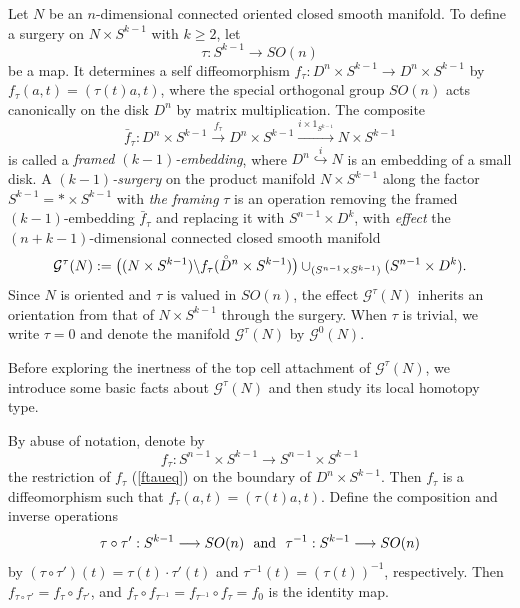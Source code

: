\documentclass[a4]{amsart}
\theoremstyle{definition}
\begin{document}
\begin{sloppypar}
Let $N$ be an $n$-dimensional connected oriented closed smooth manifold. To define a surgery on $N\times S^{k-1}$ with $k\geq 2$, let 
\[
\tau: S^{k-1}\stackrel{}{\longrightarrow} SO(n)
\]
be a map. 
It determines a self diffeomorphism $
f_\tau: D^n \times S^{k-1}\stackrel{}{\longrightarrow}D^n \times S^{k-1}
$ 
by $f_\tau (a, t)=(\tau(t)a, t)$, where the special orthogonal group $SO(n)$ acts canonically on the disk $D^n$ by matrix multiplication. The composite 
\begin{equation}\label{ftaueq}
\bar{f}_\tau: D^n \times S^{k-1}\stackrel{f_\tau}{\longrightarrow}D^n \times S^{k-1}\stackrel{i\times 1_{S^{k-1}}}{\longrightarrow}N\times S^{k-1}
\end{equation}
is called a {\it framed $(k-1)$-embedding}, where $D^n\stackrel{i}{\hookrightarrow} N$ is an embedding of a small disk. A {\it $(k-1)$-surgery} on the product manifold $N\times S^{k-1}$ along the factor $S^{k-1}=\ast\times S^{k-1}$ with {\it the framing} $\tau$ is an operation removing the framed $(k-1)$-embedding $\bar{f}_\tau$ and replacing it with $S^{n-1}\times D^k$, with {\it effect} the $(n+k-1)$-dimensional connected closed smooth manifold
\[
\mathcal{G}^{\tau}(N):=\big((N\times S^{k-1})\backslash f_\tau(\accentset{\circ}{D}^{n}\times  S^{k-1})\big)\cup_{(S^{n-1}\times S^{k-1})} (S^{n-1}\times D^{k}).
\]
Since $N$ is oriented and $\tau$ is valued in $SO(n)$, the effect $\mathcal{G}^{\tau}(N)$ inherits an orientation from that of $N\times S^{k-1}$ through the surgery. When $\tau$ is trivial, we write $\tau=0$ and denote the manifold $\mathcal{G}^{\tau}(N)$ by $\mathcal{G}^{0}(N)$. 

Before exploring the inertness of the top cell attachment of $\mathcal{G}^{\tau}(N)$, we introduce some basic facts about $\mathcal{G}^{\tau}(N)$ and then study its local homotopy type. 
 
By abuse of notation, denote by 
\[
f_\tau: S^{n-1}\times S^{k-1}\stackrel{}{\longrightarrow} S^{n-1}\times S^{k-1}
\]
the restriction of $f_\tau$ (\ref{ftaueq}) on the boundary of $D^n\times S^{k-1}$. Then $f_\tau$ is a diffeomorphism such that $f_\tau(a, t)=(\tau(t)a, t)$. Define the composition and inverse operations 
\[
\tau\circ \tau': S^{k-1}\stackrel{}{\longrightarrow} SO(n) \  \ {\rm and}  \   \ 
 \tau^{-1}: S^{k-1}\stackrel{}{\longrightarrow} SO(n)
\]
by $(\tau\circ \tau')(t)=\tau(t)\cdot \tau'(t)$ and $\tau^{-1}(t)= (\tau(t))^{-1}$, respectively. 
Then $f_{\tau\circ \tau'}=f_{\tau}\circ f_{\tau'}$, and $f_\tau\circ f_{\tau^{-1}}= f_{\tau^{-1}}\circ f_\tau=f_0$ is the identity map. 


\end{sloppypar}
\end{document}
